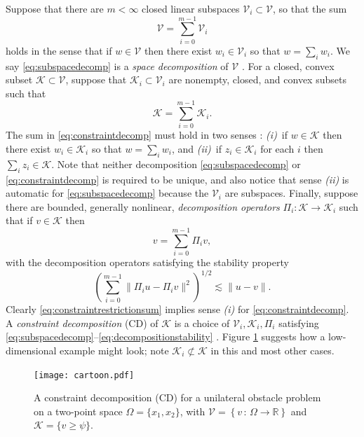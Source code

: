 \documentclass[review,hidelinks,onefignum,onetabnum,final]{siamart220329}  %
\newcommand{\RR}{\mathbb{R}}
\newcommand{\cK}{\mathcal{K}}
\newcommand{\cV}{\mathcal{V}}
\begin{document}
Suppose that there are $m<\infty$ closed linear subspaces $\cV_i \subset \cV$, so that the sum
\begin{equation}
\cV = \sum_{i=0}^{m-1} \cV_i \label{eq:subspacedecomp}
\end{equation}
holds in the sense that if $w \in \cV$ then there exist $w_i \in \cV_i$ so that $w = \sum_i w_i$.  We say \eqref{eq:subspacedecomp} is a \emph{space decomposition} of $\cV$ \cite{Xu1992}.  For a closed, convex subset $\cK \subset \cV$, suppose that $\cK_i \subset \cV_i$ are nonempty, closed, and convex subsets such that
\begin{equation}
\cK = \sum_{i=0}^{m-1} \cK_i. \label{eq:constraintdecomp}
\end{equation}
The sum in \eqref{eq:constraintdecomp} must hold in two senses \cite{TaiTseng2002}: \emph{(i)}~if $w \in \cK$ then there exist $w_i \in \cK_i$ so that $w = \sum_i w_i$, and \emph{(ii)}~if $z_i \in \cK_i$ for each $i$ then $\sum_i z_i \in \cK$.  Note that neither decomposition \eqref{eq:subspacedecomp} or \eqref{eq:constraintdecomp} is required to be unique, and also notice that sense \emph{(ii)} is automatic for \eqref{eq:subspacedecomp} because the $\cV_i$ are subspaces.  Finally, suppose there are bounded, generally nonlinear, \emph{decomposition operators} $\Pi_i : \cK \to \cK_i$ such that if $v \in \cK$ then
\begin{equation}
v = \sum_{i=0}^{m-1} \Pi_i v,  \label{eq:constraintrestrictionsum}
\end{equation}
with the decomposition operators satisfying the stability property
\begin{equation} \label{eq:decompositionstability}
\left(\sum_{i=0}^{m-1} \| \Pi_i u - \Pi_i v \|^2\right)^{1/2} \lesssim \|u - v\|.
\end{equation}
Clearly \eqref{eq:constraintrestrictionsum} implies sense \emph{(i)} for \eqref{eq:constraintdecomp}.  A \emph{constraint decomposition} (CD) of $\cK$ is a choice of $\cV_i,\cK_i,\Pi_i$ satisfying \eqref{eq:subspacedecomp}--\eqref{eq:decompositionstability} \cite{Tai2003}.  Figure \ref{fig:cartoon} suggests how a low-dimensional example might look; note $\cK_i \not\subset \cK$ in this and most other cases.

\begin{figure}[ht]
\centering
\texttt{[image: cartoon.pdf]}
\caption{A constraint decomposition (CD) for a unilateral obstacle problem on a two-point space $\Omega=\{x_1,x_2\}$, with $\mathcal{V}=\left\{v \,:\, \Omega \to \RR\right\}$ and $\mathcal{K}=\{v\ge \psi\}$.}
\label{fig:cartoon}
\end{figure}
\end{document}
